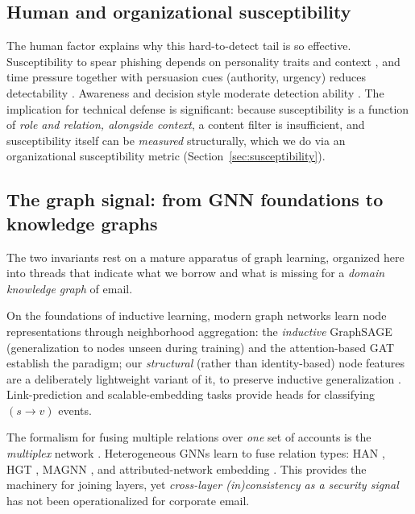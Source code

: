 \subsection{Human and organizational susceptibility}
\label{sec:rw-suscept}
The human factor explains why this hard-to-detect tail is so effective. Susceptibility to spear phishing depends on
personality traits and context \citep{halevi2015spearphishing}, and time pressure together with persuasion cues
(authority, urgency) reduces detectability \citep{butavicius2022why}. Awareness and decision style
moderate detection ability \citep{sturman2025security}. The implication for technical defense is significant:
because susceptibility is a function of \emph{role and relation, alongside context}, a content filter is
insufficient, and susceptibility itself can be \emph{measured} structurally, which we do via an organizational
susceptibility metric (Section~\ref{sec:susceptibility}).

\subsection{The graph signal: from GNN foundations to knowledge graphs}
\label{sec:rw-graph}
The two invariants rest on a mature apparatus of graph learning, organized here into threads that indicate
what we borrow and what is missing for a \emph{domain knowledge graph} of email.

On the foundations of inductive learning, modern graph networks learn node representations through
neighborhood aggregation: the \emph{inductive} GraphSAGE \citep{hamilton2017inductive} (generalization to nodes
unseen during training) and the attention-based GAT \citep{velickovic2018graph} establish the paradigm; our \emph{structural} (rather than identity-based) node features are a deliberately
lightweight variant of it, to preserve inductive generalization \citep{xu2020inductive,hao2020inductive}. Link-prediction and scalable-embedding tasks
\citep{zhang2018link,zhang2018scalable} provide heads for classifying $(s\!\to\!v)$ events.

The formalism for fusing multiple relations over \emph{one}
set of accounts is the \emph{multiplex} network
\citep{kivela2014multilayer,dedomenico2013mathematical,magnani2013combinatorial,jeude2019multilayer}.
Heterogeneous GNNs learn to fuse relation types: HAN \citep{wang2019heterogeneous}, HGT \citep{hu2020heterogeneous},
MAGNN \citep{fu2020magnn}, and attributed-network embedding \citep{christophides2021overview,cen2019representation}.
This provides the machinery for joining layers, yet \emph{cross-layer (in)consistency as a security signal}
has not been operationalized for corporate email.

